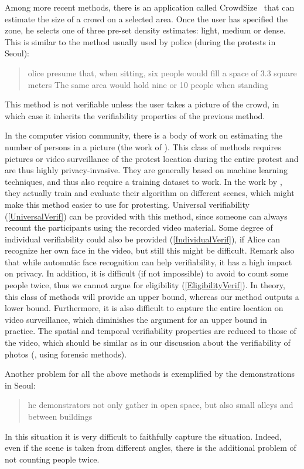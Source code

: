 Among more recent methods, there is an application called CrowdSize~\cite{CrowdSize} that can estimate the size of a crowd on a selected area.
Once the user has specified the zone, he selects one of three pre-set density estimates: light, medium or dense.
This is similar to the method usually used by police (\eg during the protests in Seoul):
\blockcquote{2016DemonstrationsInSeoul}{%
  olice presume that, when sitting, six people would fill a space of 3.3 square meters
  \textelp{}
  The same area would hold nine or 10 people when standing%
}.
This method is not verifiable unless the user takes a picture of the crowd, in which case it inherits the verifiability properties of the previous method.

In the computer vision community, there is a body of work on estimating the number of persons in a picture (\eg the work of \citet{NNCrowdCounting}).
This class of methods requires pictures or video surveillance of the protest location during the entire protest and are thus highly privacy-invasive.
They are generally based on machine learning techniques, and thus also require a training dataset to work.
In the work by \cite{NNCrowdCounting}, they actually train and evaluate their algorithm on different scenes, which might make this method easier to use for protesting.
Universal verifiability (\cref{UniversalVerif}) can be provided with this method, since someone can always recount the participants using the recorded video material.
Some degree of individual verifiability could also be provided (\cref{IndividualVerif}), if Alice can recognize her own face in the video, but still this might be difficult. 
Remark also that while automatic face recognition can help verifiability, it has a high impact on privacy.
In addition, it is difficult (if not impossible) to avoid to count some people twice, thus we cannot argue for eligibility (\cref{EligibilityVerif}).
In theory, this class of methods will provide an upper bound, whereas our method outputs a lower bound.
Furthermore, it is also difficult to capture the entire location on video surveillance, which diminishes the argument for an upper bound in practice.
The spatial and temporal verifiability properties are reduced to those of the video, which should be similar as in our discussion about the verifiability of photos (\ie, using forensic methods).

Another problem for all the above methods is exemplified by the demonstrations in Seoul:
\blockcquote{2016DemonstrationsInSeoul}{%
  he demonstrators not only gather in open space, but also small alleys and between buildings%
}.
In this situation it is very difficult to faithfully capture the situation.
Indeed, even if the scene is taken from different angles, there is the additional problem of not counting people twice.

